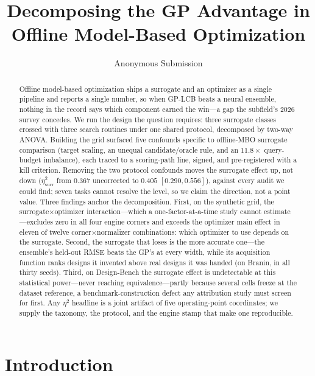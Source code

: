 \documentclass[letterpaper]{article} %
\title{Decomposing the GP Advantage in Offline Model-Based Optimization}
\author{Anonymous Submission}
\theoremstyle{plain}
\begin{document}
\maketitle

\begin{abstract}
Offline model-based optimization ships a surrogate and an optimizer as a single pipeline and reports a single number, so when GP-LCB beats a neural ensemble, nothing in the record says which component earned the win---a gap the subfield's 2026 survey concedes. We run the design the question requires: three surrogate classes crossed with three search routines under one shared protocol, decomposed by two-way ANOVA. Building the grid surfaced five confounds specific to offline-MBO surrogate comparison (target scaling, an unequal candidate/oracle rule, and an $11.8\times$ query-budget imbalance), each traced to a scoring-path line, signed, and pre-registered with a kill criterion. Removing the two protocol confounds moves the surrogate effect up, not down ($\eta^2_{\text{surr}}$ from $0.367$ uncorrected to $0.405$ $[0.290, 0.556]$), against every audit we could find; seven tasks cannot resolve the level, so we claim the direction, not a point value. Three findings anchor the decomposition. First, on the synthetic grid, the surrogate$\times$optimizer interaction---which a one-factor-at-a-time study cannot estimate---excludes zero in all four engine corners and exceeds the optimizer main effect in eleven of twelve corner$\times$normalizer combinations: which optimizer to use depends on the surrogate. Second, the surrogate that loses is the more accurate one---the ensemble's held-out RMSE beats the GP's at every width, while its acquisition function ranks designs it invented above real designs it was handed (on Branin, in all thirty seeds). Third, on Design-Bench the surrogate effect is undetectable at this statistical power---never reaching equivalence---partly because several cells freeze at the dataset reference, a benchmark-construction defect any attribution study must screen for first. Any $\eta^2$ headline is a joint artifact of five operating-point coordinates; we supply the taxonomy, the protocol, and the engine stamp that make one reproducible.
\end{abstract}


\section{Introduction}
\end{document}
